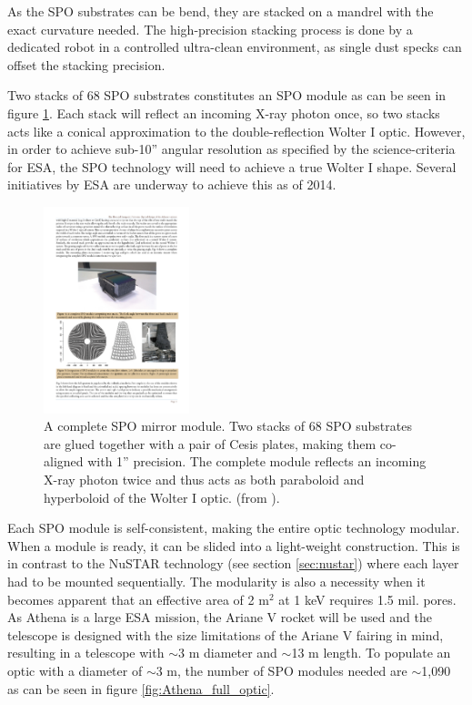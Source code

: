 As the SPO substrates can be bend, they are stacked on a mandrel with the exact curvature needed. The high-precision stacking process is done by a dedicated robot in a controlled ultra-clean environment, as single dust specks can offset the stacking precision.

Two stacks of 68 SPO substrates constitutes an SPO module as can be seen in figure \ref{fig:spo_stack}. Each stack will reflect an incoming X-ray photon once, so two stacks acts like a conical approximation to the double-reflection Wolter I optic. However, in order to achieve sub-10'' angular resolution as specified by the science-criteria for ESA, the SPO technology will need to achieve a true Wolter I shape. Several initiatives by ESA are underway to achieve this as of 2014.

\begin{figure}[!h]
  \center
  \includegraphics[height=6cm]{figures/athena/spo_stack.pdf}
\caption{\footnotesize A complete SPO mirror module. Two stacks of 68 SPO substrates are glued together with a pair of Cesis plates, making them co-aligned with 1'' precision. The complete module reflects an incoming X-ray photon twice and thus acts as both paraboloid and hyperboloid of the Wolter I optic. (from \cite{Willingale:2013vo}).}\label{fig:spo_stack}
\end{figure}

Each SPO module is self-consistent, making the entire optic technology modular. When a module is ready, it can be slided into a light-weight construction. This is in contrast to the NuSTAR technology (see section \ref{sec:nustar}) where each layer had to be mounted sequentially. The modularity is also a necessity when it becomes apparent that an effective area of 2 m$^2$ at 1 keV requires 1.5 mil. pores. As Athena is a large ESA mission, the Ariane V rocket will be used and the telescope is designed with the size limitations of the Ariane V fairing in mind, resulting in a telescope with $\sim$3 m diameter and $\sim$13 m length. To populate an optic with a diameter of $\sim$3 m, the number of SPO modules needed are $\sim$1,090 as can be seen in figure \ref{fig:Athena_full_optic}.

